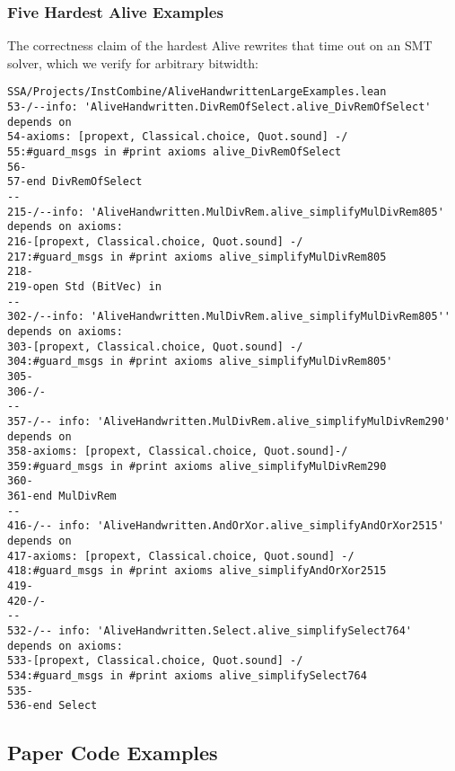 \documentclass{sigplanconf}
\begin{document}
\subsubsection{Five Hardest Alive Examples}

The correctness claim of the hardest Alive rewrites that time out on an SMT solver, which we verify 
for arbitrary bitwidth:

\begin{verbatim}
SSA/Projects/InstCombine/AliveHandwrittenLargeExamples.lean
53-/--info: 'AliveHandwritten.DivRemOfSelect.alive_DivRemOfSelect' depends on
54-axioms: [propext, Classical.choice, Quot.sound] -/
55:#guard_msgs in #print axioms alive_DivRemOfSelect
56-
57-end DivRemOfSelect
--
215-/--info: 'AliveHandwritten.MulDivRem.alive_simplifyMulDivRem805' depends on axioms:
216-[propext, Classical.choice, Quot.sound] -/
217:#guard_msgs in #print axioms alive_simplifyMulDivRem805
218-
219-open Std (BitVec) in
--
302-/--info: 'AliveHandwritten.MulDivRem.alive_simplifyMulDivRem805'' depends on axioms:
303-[propext, Classical.choice, Quot.sound] -/
304:#guard_msgs in #print axioms alive_simplifyMulDivRem805'
305-
306-/-
--
357-/-- info: 'AliveHandwritten.MulDivRem.alive_simplifyMulDivRem290' depends on
358-axioms: [propext, Classical.choice, Quot.sound]-/
359:#guard_msgs in #print axioms alive_simplifyMulDivRem290
360-
361-end MulDivRem
--
416-/-- info: 'AliveHandwritten.AndOrXor.alive_simplifyAndOrXor2515' depends on
417-axioms: [propext, Classical.choice, Quot.sound] -/
418:#guard_msgs in #print axioms alive_simplifyAndOrXor2515
419-
420-/-
--
532-/-- info: 'AliveHandwritten.Select.alive_simplifySelect764' depends on axioms:
533-[propext, Classical.choice, Quot.sound] -/
534:#guard_msgs in #print axioms alive_simplifySelect764
535-
536-end Select
\end{verbatim}

\subsection{Paper Code Examples}
\end{document}
